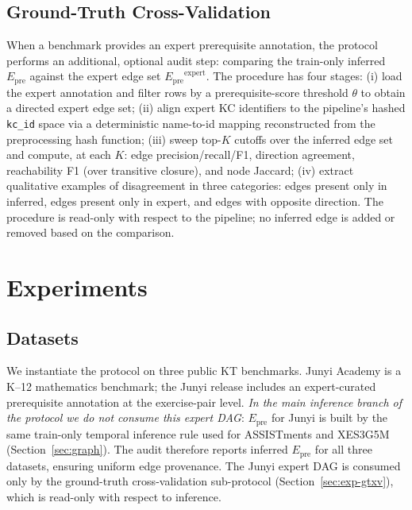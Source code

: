 \documentclass[runningheads]{llncs}
\newcommand{\Epre}{\ensuremath{E_{\text{pre}}}}
\begin{document}
\subsection{Ground-Truth Cross-Validation}
\label{sec:gtxv-protocol}
When a benchmark provides an expert prerequisite annotation, the
protocol performs an additional, optional audit step: comparing the
train-only inferred $\Epre$ against the expert edge set
$\Epre^{\text{expert}}$. The procedure has four stages:
(i) load the expert annotation and filter rows by a prerequisite-score
threshold $\theta$ to obtain a directed expert edge set;
(ii) align expert KC identifiers to the pipeline's hashed \texttt{kc\_id}
space via a deterministic name-to-id mapping reconstructed from the
preprocessing hash function;
(iii) sweep top-$K$ cutoffs over the inferred edge set and compute,
at each $K$: edge precision/recall/F1, direction agreement, reachability
F1 (over transitive closure), and node Jaccard;
(iv) extract qualitative examples of disagreement in three categories:
edges present only in inferred, edges present only in expert, and edges
with opposite direction.
The procedure is read-only with respect to the pipeline; no
inferred edge is added or removed based on the comparison.
\section{Experiments}
\label{sec:exp}
\subsection{Datasets}
\label{sec:datasets}
We instantiate the protocol on three public KT benchmarks. Junyi Academy
\cite{junyi_dataset} is a K--12 mathematics benchmark; the Junyi release
includes an expert-curated prerequisite annotation at the
exercise-pair level. \emph{In the main inference branch of the protocol
we do not consume this expert DAG}: $\Epre$ for Junyi is built by the
same train-only temporal inference rule used for ASSISTments and
XES3G5M (Section~\ref{sec:graph}). The audit therefore reports inferred
$\Epre$ for all three datasets, ensuring uniform edge provenance. The
Junyi expert DAG is consumed only by the ground-truth cross-validation
sub-protocol (Section~\ref{sec:exp-gtxv}), which is read-only with
respect to inference.
\end{document}
